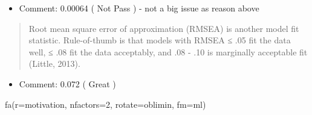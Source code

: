 \documentclass[
]{article}
\newenvironment{Shaded}{\begin{snugshade}}{\end{snugshade}}
\newcommand{\AttributeTok}[1]{\textcolor[rgb]{0.77,0.63,0.00}{#1}}
\newcommand{\DecValTok}[1]{\textcolor[rgb]{0.00,0.00,0.81}{#1}}
\newcommand{\FunctionTok}[1]{\textcolor[rgb]{0.00,0.00,0.00}{#1}}
\newcommand{\NormalTok}[1]{#1}
\newcommand{\StringTok}[1]{\textcolor[rgb]{0.31,0.60,0.02}{#1}}
\providecommand{\tightlist}{%
  \setlength{\itemsep}{0pt}\setlength{\parskip}{0pt}}
\begin{document}
\begin{itemize}
\tightlist
\item
  Comment: 0.00064 ( Not Pass ) - not a big issue as reason above
\end{itemize}

\begin{quote}
Root mean square error of approximation (RMSEA) is another model fit
statistic. Rule-of-thumb is that models with RMSEA ≤ .05 fit the data
well, ≤ .08 fit the data acceptably, and .08 - .10 is marginally
acceptable fit (Little, 2013).
\end{quote}

\begin{itemize}
\tightlist
\item
  Comment: 0.072 ( Great )
\end{itemize}

\begin{Shaded}
\begin{Highlighting}[]
\FunctionTok{fa}\NormalTok{(}\AttributeTok{r=}\NormalTok{motivation, }\AttributeTok{nfactors=}\DecValTok{2}\NormalTok{, }\AttributeTok{rotate=}\StringTok{\textquotesingle{}oblimin\textquotesingle{}}\NormalTok{, }\AttributeTok{fm=}\StringTok{\textquotesingle{}ml\textquotesingle{}}\NormalTok{)}
\end{Highlighting}
\end{Shaded}
\end{document}

